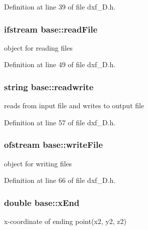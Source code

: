 Definition at line 39 of file dxf\-\_\-D.\-h.

\hypertarget{classbase_a707f4830c851eb50e9e2299fae731075}{
\subsubsection[{read\-File}]{\setlength{\rightskip}{0pt plus 5cm}ifstream base\-::read\-File\hspace{0.3cm}{\ttfamily [protected]}}}\label{classbase_a707f4830c851eb50e9e2299fae731075}
object for reading files 

Definition at line 49 of file dxf\-\_\-D.\-h.

\hypertarget{classbase_a8d165e9a0576b127d61404745e4deb1a}{
\subsubsection[{readwrite}]{\setlength{\rightskip}{0pt plus 5cm}string base\-::readwrite\hspace{0.3cm}{\ttfamily [protected]}}}\label{classbase_a8d165e9a0576b127d61404745e4deb1a}
reads from input file and writes to output file 

Definition at line 57 of file dxf\-\_\-D.\-h.

\hypertarget{classbase_a1a4cdb81a9c9f77818a0fdd34165a1ab}{
\subsubsection[{write\-File}]{\setlength{\rightskip}{0pt plus 5cm}ofstream base\-::write\-File}}\label{classbase_a1a4cdb81a9c9f77818a0fdd34165a1ab}
object for writing files 

Definition at line 66 of file dxf\-\_\-D.\-h.

\hypertarget{classbase_aa4702751e837e49dcb88eaf2944f3c1f}{
\subsubsection[{x\-End}]{\setlength{\rightskip}{0pt plus 5cm}double base\-::x\-End\hspace{0.3cm}{\ttfamily [protected]}}}\label{classbase_aa4702751e837e49dcb88eaf2944f3c1f}
x-\/coordinate of ending point(x2, y2, z2) 

